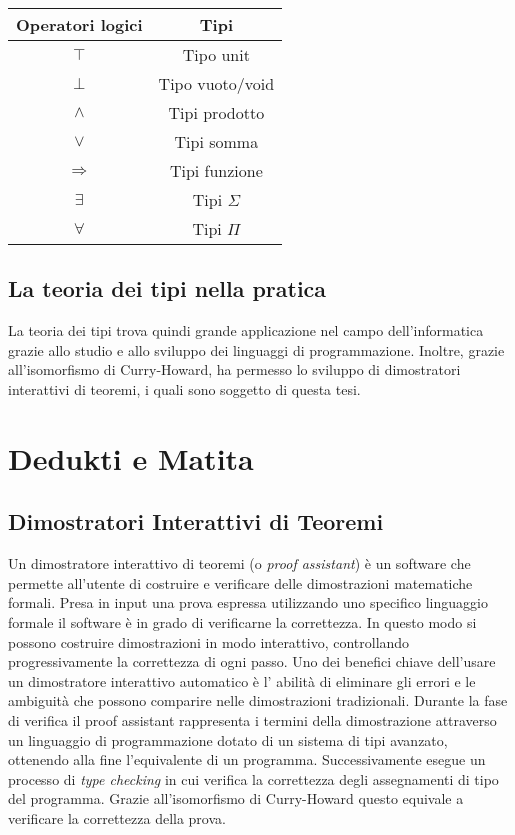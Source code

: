 \documentclass[12pt,a4paper]{report}
\begin{document}
\begin{center}
  \begin{tabular}{ | c | c |}
    \hline
    \textbf{Operatori logici} & \textbf{Tipi} \\
    \hline
    $\top$ & Tipo unit \\
    \hline
    $\bot $ & Tipo vuoto/void \\
    \hline
   $\wedge$ & Tipi prodotto \\  
    \hline
   $\vee$ & Tipi somma \\
    \hline
   $\Rightarrow$ & Tipi funzione \\ 
    \hline
   $\exists$ & Tipi $\Sigma$ \\ 
    \hline
    $\forall $ & Tipi $\Pi$ \\ 
    \hline

  \end{tabular}
\end{center}

\subsection{La teoria dei tipi nella pratica}
La teoria dei tipi trova quindi grande applicazione nel campo dell'informatica
grazie allo studio e allo sviluppo dei linguaggi di programmazione. Inoltre,
grazie all'isomorfismo di Curry-Howard, ha permesso lo sviluppo di dimostratori
interattivi di teoremi, i quali sono soggetto di questa tesi.

\section{Dedukti e Matita}\label{proofAssistant}
\subsection{Dimostratori Interattivi di Teoremi} 
Un dimostratore interattivo di teoremi (o \textit{proof assistant}) è un software 
che permette all'utente di costruire e verificare delle dimostrazioni matematiche
formali. Presa in input una prova espressa utilizzando uno specifico linguaggio 
formale il software è in grado di
verificarne la correttezza. In questo modo si possono costruire dimostrazioni
in modo interattivo, controllando progressivamente la correttezza di ogni passo.
Uno dei benefici chiave dell'usare un dimostratore interattivo automatico è l'
abilità di eliminare gli errori e le ambiguità che possono comparire nelle 
dimostrazioni tradizionali. Durante la fase di verifica il proof assistant
rappresenta i termini della dimostrazione attraverso un linguaggio di programmazione
dotato di un sistema di tipi avanzato, ottenendo alla fine l'equivalente di un
programma. Successivamente esegue un processo di \textit{type checking} in cui
verifica la correttezza degli assegnamenti di tipo del programma. Grazie all'isomorfismo
di Curry-Howard questo equivale a verificare la correttezza della prova.
\end{document}
